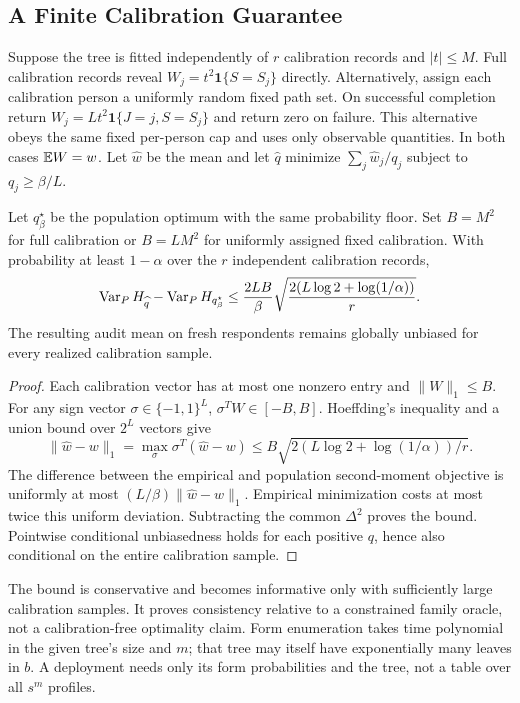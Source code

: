 \subsection{A Finite Calibration Guarantee}
Suppose the tree is fitted independently of $r$ calibration records and $|t|\le M$. Full calibration records reveal $W_j=t^2\mathbf1\{S=S_j\}$ directly. Alternatively, assign each calibration person a uniformly random fixed path set. On successful completion return $W_j=L t^2\mathbf1\{J=j,S=S_j\}$ and return zero on failure. This alternative obeys the same fixed per-person cap and uses only observable quantities. In both cases $\mathbb{E} W=w$. Let $\widehat w$ be the mean and let $\widehat q$ minimize $\sum_j\widehat w_j/q_j$ subject to $q_j\ge\beta/L$.

\begin{proposition}\label{prop:pilot}
Let $q_\beta^\star$ be the population optimum with the same probability floor. Set $B=M^2$ for full calibration or $B=LM^2$ for uniformly assigned fixed calibration. With probability at least $1-\alpha$ over the $r$ independent calibration records,
\[
 \operatorname{Var}_P H_{\widehat q}-\operatorname{Var}_P H_{q_\beta^\star}
 \le\frac{2LB}{\beta}\sqrt{\frac{2(L\log2+\log(1/\alpha))}{r}}.
\]
The resulting audit mean on fresh respondents remains globally unbiased for every realized calibration sample.
\end{proposition}
\begin{proof}
Each calibration vector has at most one nonzero entry and $\|W\|_1\le B$. For any sign vector $\sigma\in\{-1,1\}^L$, $\sigma^TW\in[-B,B]$. Hoeffding's inequality and a union bound over $2^L$ vectors give
\[
 \|\widehat w-w\|_1
 =\max_\sigma\sigma^T(\widehat w-w)
 \le B\sqrt{2(L\log2+\log(1/\alpha))/r}.
\]
The difference between the empirical and population second-moment objective is uniformly at most $(L/\beta)\|\widehat w-w\|_1$. Empirical minimization costs at most twice this uniform deviation. Subtracting the common $\Delta^2$ proves the bound. Pointwise conditional unbiasedness holds for each positive $q$, hence also conditional on the entire calibration sample.
\end{proof}
The bound is conservative and becomes informative only with sufficiently large calibration samples. It proves consistency relative to a constrained family oracle, not a calibration-free optimality claim. Form enumeration takes time polynomial in the given tree's size and $m$; that tree may itself have exponentially many leaves in $b$. A deployment needs only its form probabilities and the tree, not a table over all $s^m$ profiles.

